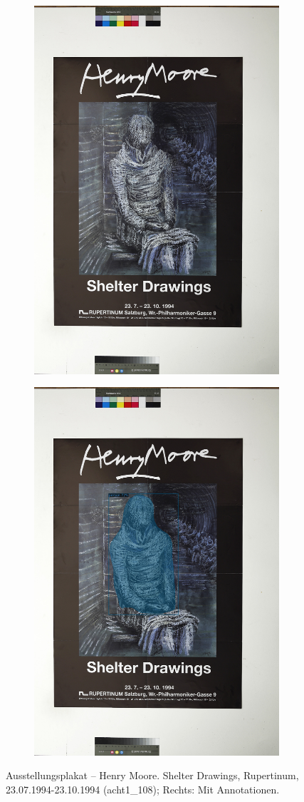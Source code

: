 \documentclass[a4paper,12pt,ngerman]{article}
\begin{document}
\newpage
\begin{landscape}
\begin{figure}[ht]
	\begin{subfigure}[b]{0.5\linewidth}
	\centering
	\includegraphics[height=\linewidth]{Abbildung_38_(acht1_108)}
	\end{subfigure}
	\begin{subfigure}[b]{0.5\linewidth}
	\centering
	\includegraphics[height=\linewidth]{Abbildung_38_(acht1_108)_with_detections}
	\end{subfigure}
	\caption{Ausstellungsplakat -- Henry Moore. Shelter Drawings, Rupertinum, 23.07.1994-23.10.1994 (acht1\_108); Rechts: Mit Annotationen.}
\end{figure}
\end{landscape}
\end{document}
